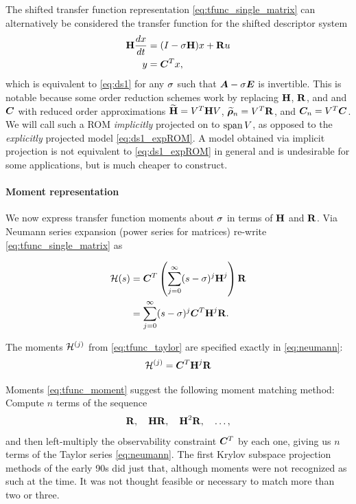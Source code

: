 The shifted transfer function representation \eqref{eq:tfunc_single_matrix} can alternatively be considered the transfer function for the shifted descriptor system
 \begin{equation}
         \begin{aligned}
                \textbf{\textup{H}} \frac{dx}{dt} &= (I - \sigma \textbf{\textup{H}}) x + \textbf{\textup{R}} u\\
                y &= \bm{C}^T x,
        \end{aligned}
        \label{eq:ds1_shifted}
        \end{equation}   
which is equivalent to \eqref{eq:ds1} for any $\sigma$ such that $\bm{A} - \sigma \bm{E}$ is invertible.  This is notable because some order reduction schemes work by replacing $\textbf{\textup{H}}$, $\textbf{\textup{R}}$, and and $\bm{C}$ with reduced order approximations $\widetilde{\textbf{\textup{H}}} = V^T \textbf{\textup{H}} V$, $\widetilde{\boldsymbol{\rho}}_n = V^T \textbf{\textup{R}}$, and $\bm{C}_n = V^T \bm{C}$.    We will call such a ROM \emph{implicitly} projected on to $\operatorname*{span} V$, as opposed to the \emph{explicitly} projected model \eqref{eq:ds1_expROM}.   A model obtained via implicit projection is not equivalent to \eqref{eq:ds1_expROM} in general and is undesirable for some applications, but is much cheaper to construct. 

\paragraph{Moment representation}
We now express transfer function moments about $\sigma$ in terms of $\textbf{\textup{H}}$ and $\textbf{\textup{R}}$. 
        Via Neumann series expansion (power series for matrices) re-write \eqref{eq:tfunc_single_matrix} as
        
\begin{equation}
\begin{aligned}
                \mathcal{H}(s) &= \bm{C}^T\left(\sum_{j=0}^\infty (s-\sigma )^j\textbf{\textup{H}}^j\right)\textbf{\textup{R}} \\
			    &= \sum_{j=0}^\infty (s-\sigma )^j \bm{C}^T \textbf{\textup{H}}^j \textbf{\textup{R}}. 
         \end{aligned}
\label{eq:neumann}
\end{equation}


   The moments $\mathcal{H}^{(j)}$ from \eqref{eq:tfunc_taylor} are specified exactly in \eqref{eq:neumann}: 
\begin{equation}
\mathcal{H}^{(j)} = \bm{C}^T \textbf{\textup{H}}^j \textbf{\textup{R}}
\label{eq:tfunc_moment}
\end{equation}


Moments \eqref{eq:tfunc_moment} suggest the following moment 
matching method: Compute $n$ terms of the sequence
\begin{equation}
 \textbf{\textup{R}},\quad \textbf{\textup{H}} \textbf{\textup{R}},\quad \textbf{\textup{H}}^2 \textbf{\textup{R}}, \quad\ldots,
\label{eq:power_sequence}
\end{equation}
and then left-multiply the observability constraint $\bm{C}^T$ by each one, giving us $n$ terms of the Taylor series \eqref{eq:neumann}.   The first Krylov subspace projection methods of the early 90s did just that, although moments were not recognized as such at the time.  It was not thought feasible or necessary  to match more than two or three.


